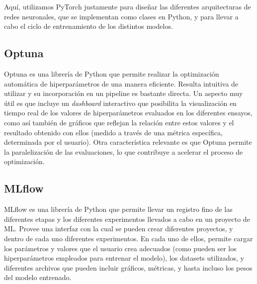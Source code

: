 \documentclass[../../main.tex]{subfiles}
\begin{document}
Aquí, utilizamos PyTorch justamente para diseñar las diferentes arquitecturas de redes
neuronales, que se implementan como clases en Python, y para llevar a cabo el ciclo de
entrenamiento de los distintos modelos.

\subsection{Optuna}
Optuna \cite{optuna-docs} es una librería de Python que permite realizar la optimización
automática de hiperparámetros de una manera eficiente. Resulta intuitiva de utilizar y su
incorporación en un pipeline es bastante directa. Un aspecto muy útil es que incluye un
\textit{dashboard} interactivo que posibilita la visualización en tiempo real de los
valores de hiperparámetros evaluados en los diferentes ensayos, como así también de
gráficos que reflejan la relación entre estos valores y el resultado obtenido con ellos
(medido a través de una métrica específica, determinada por el usuario). Otra
característica relevante es que Optuna permite la paralelización de las evaluaciones, lo
que contribuye a acelerar el proceso de optimización.

\subsection{MLflow}
MLflow \cite{mlflow-docs} es una librería de Python que permite llevar un registro fino de
las diferentes etapas y los diferentes experimentos llevados a cabo en un proyecto de ML.
Provee una interfaz con la cual se pueden crear diferentes proyectos, y dentro de cada uno
diferentes experimentos. En cada uno de ellos, permite cargar los parámetros y valores que
el usuario crea adecuados (como pueden ser los hiperparámetros empleados para entrenar el
modelo), los datasets utilizados, y diferentes archivos que pueden incluir gráficos,
métricas, y hasta incluso los pesos del modelo entrenado.
\end{document}
